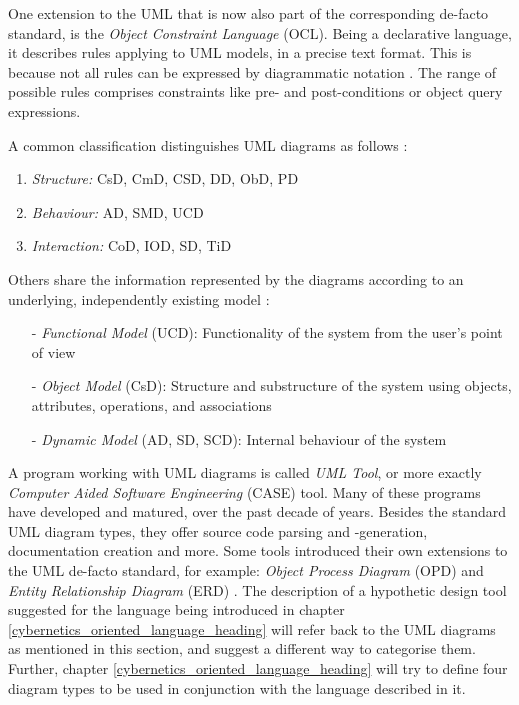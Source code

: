 One extension to the UML that is now also part of the corresponding de-facto
standard, is the \emph{Object Constraint Language} (OCL). Being a declarative
language, it describes rules applying to UML models, in a precise text format.
This is because not all rules can be expressed by diagrammatic notation
\cite{wikipedia}. The range of possible rules comprises constraints like pre-
and post-conditions or object query expressions. \cite{ocl}

A common classification distinguishes UML diagrams as follows \cite{ambler2005}:

\begin{enumerate}
    \item \emph{Structure:} CsD, CmD, CSD, DD, ObD, PD
    \item \emph{Behaviour:} AD, SMD, UCD
    \item \emph{Interaction:} CoD, IOD, SD, TiD
\end{enumerate}

Others share the information represented by the diagrams according to an
underlying, independently existing model \cite{wikipedia}:

\begin{itemize}
    \item[-] \emph{Functional Model} (UCD): Functionality of the system from
        the user's point of view
    \item[-] \emph{Object Model} (CsD): Structure and substructure of the
        system using objects, attributes, operations, and associations
    \item[-] \emph{Dynamic Model} (AD, SD, SCD): Internal behaviour of the
        system
\end{itemize}

A program working with UML diagrams is called \emph{UML Tool}, or more exactly
\emph{Computer Aided Software Engineering} (CASE) tool. Many of these programs
have developed and matured, over the past decade of years. Besides the standard
UML diagram types, they offer source code parsing and -generation,
documentation creation and more. Some tools introduced their own extensions to
the UML de-facto standard, for example: \emph{Object Process Diagram} (OPD)
\cite{burkhardt} and \emph{Entity Relationship Diagram} (ERD) \cite{otw}. The
description of a hypothetic design tool suggested for the language being
introduced in chapter \ref{cybernetics_oriented_language_heading} will refer
back to the UML diagrams as mentioned in this section, and suggest a different
way to categorise them. Further, chapter \ref{cybernetics_oriented_language_heading}
will try to define four diagram types to be used in conjunction with the
language described in it.
